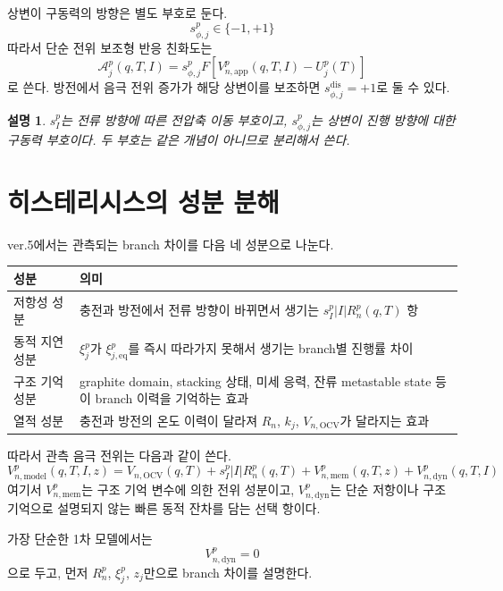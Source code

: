 \documentclass[11pt,a4paper]{article}
\newtheorem*{note}{설명}
\newcommand{\OCV}{\mathrm{OCV}}
\newcommand{\app}{\mathrm{app}}
\newcommand{\eq}{\mathrm{eq}}
\newcommand{\dis}{\mathrm{dis}}
\begin{document}
상변이 구동력의 방향은 별도 부호로 둔다.
\begin{equation}
s_{\phi,j}^{p}\in\{-1,+1\}
\end{equation}
따라서 단순 전위 보조형 반응 친화도는
\begin{equation}
\mathcal A_j^{p}(q,T,I)
=
s_{\phi,j}^{p}F\left[V_{n,\app}^{p}(q,T,I)-U_j^{p}(T)\right]
\label{eq:v5_affinity_branch}
\end{equation}
로 쓴다. 방전에서 음극 전위 증가가 해당 상변이를 보조하면 \(s_{\phi,j}^{\dis}=+1\)로 둘 수 있다.

\begin{note}
\(s_I^p\)는 전류 방향에 따른 전압축 이동 부호이고, \(s_{\phi,j}^p\)는 상변이 진행 방향에 대한 구동력 부호이다. 두 부호는 같은 개념이 아니므로 분리해서 쓴다.
\end{note}

\section{히스테리시스의 성분 분해}
ver.5에서는 관측되는 branch 차이를 다음 네 성분으로 나눈다.
\begin{longtable}{p{}p{}}
\toprule
성분 & 의미 \\
\midrule
\endhead
저항성 성분 & 충전과 방전에서 전류 방향이 바뀌면서 생기는 \(s_I^p|I|R_n^p(q,T)\) 항 \\
동적 지연 성분 & \(\xi_j^p\)가 \(\xi_{j,\eq}^p\)를 즉시 따라가지 못해서 생기는 branch별 진행률 차이 \\
구조 기억 성분 & graphite domain, stacking 상태, 미세 응력, 잔류 metastable state 등이 branch 이력을 기억하는 효과 \\
열적 성분 & 충전과 방전의 온도 이력이 달라져 \(R_n\), \(k_j\), \(V_{n,\OCV}\)가 달라지는 효과 \\
\bottomrule
\end{longtable}

따라서 관측 음극 전위는 다음과 같이 쓴다.
\begin{equation}
V_{n,\mathrm{model}}^{p}(q,T,I,z)
=
V_{n,\OCV}(q,T)
+
s_I^p|I|R_n^{p}(q,T)
+
V_{n,\mathrm{mem}}^{p}(q,T,z)
+
V_{n,\mathrm{dyn}}^{p}(q,T,I)
\label{eq:v5_voltage_full}
\end{equation}
여기서 \(V_{n,\mathrm{mem}}^{p}\)는 구조 기억 변수에 의한 전위 성분이고, \(V_{n,\mathrm{dyn}}^{p}\)는 단순 저항이나 구조 기억으로 설명되지 않는 빠른 동적 잔차를 담는 선택 항이다.

가장 단순한 1차 모델에서는
\begin{equation}
V_{n,\mathrm{dyn}}^{p}=0
\end{equation}
으로 두고, 먼저 \(R_n^p\), \(\xi_j^p\), \(z_j\)만으로 branch 차이를 설명한다.
\end{document}
